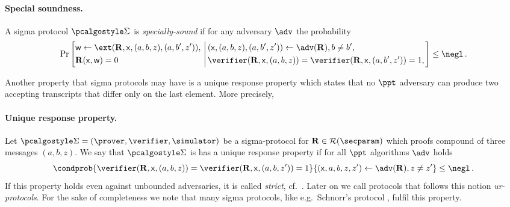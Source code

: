 \documentclass[runningheads,10pt]{llncs}
\begin{document}
\paragraph{Special soundness.} A sigma protocol $\sigmaprot$ is \emph{specially-sound}
  if for any adversary $\adv$ the probability
	\[
		\Pr\left[
		\begin{aligned}
				& \wit \gets \ext(\REL, \inp, (a, b, z), (a, b', z')),\\
				& \REL(\inp, \wit) = 0
		\end{aligned}
		\,\left|\,
		\begin{aligned}
          & (\inp, (a, b, z), (a, b', z')) \gets \adv(\REL), %
           b \neq b',  \\
          & \verifier(\REL, \inp, (a, b, z)) = %
            \verifier(\REL, \inp, (a, b', z')) = 1, \\
		\end{aligned}
		\right.\right] \leq  \negl\,.
	\]

Another property that sigma protocols may have is a unique response
property \cite{C:Fischlin05} which states that no $\ppt$ adversary can
produce two accepting transcripts that differ only on the last
element. More precisely, 
\paragraph{Unique response property.} Let
$\sigmaprot = (\prover, \verifier, \simulator)$ be a sigma-protocol for
$\REL \in \RELGEN(\secparam)$ which proofs compound of three messages
$(a, b, z)$. We say that $\sigmaprot$ is has a unique response property if for
all $\ppt$ algorithms $\adv$ holds
\[ \condprob{\verifier (\REL, \inp, (a, b, z)) = \verifier (\REL, \inp, (a, b,
    z')) = 1}{(\inp, a, b, z, z') \gets \adv(\REL), z \neq z'} \leq \negl\,.  \]
If this property holds even against unbounded adversaries, it is called
\emph{strict}, cf.~\cite{INDOCRYPT:FKMV12}. Later on we call protocols that
follows this notion \emph{ur-protocols}. For the sake of completeness we note
that many sigma protocols, like e.g.~Schnorr's protocol \cite{C:Schnorr89},
fulfil this property.
\end{document}
